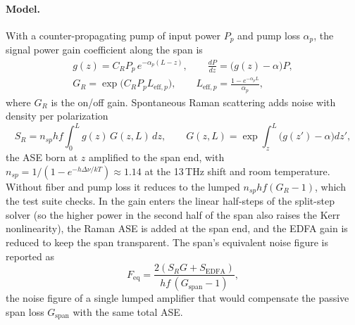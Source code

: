 \paragraph{Model.} With a counter-propagating pump of input power $P_p$ and pump loss $\alpha_p$, the
signal power gain coefficient along the span is
\begin{gather}
  g(z)=C_RP_p\,e^{-\alpha_p(L-z)},\qquad \frac{dP}{dz}=\big(g(z)-\alpha\big)P,\\
  G_R=\exp\big(C_RP_pL_{\mathrm{eff},p}\big),\qquad L_{\mathrm{eff},p}=\frac{1-e^{-\alpha_pL}}{\alpha_p},
\end{gather}
where $G_R$ is the on/off gain. Spontaneous Raman scattering adds noise with density per polarization
\begin{equation}
  S_R=n_{sp}hf\int_0^Lg(z)\,G(z,L)\,dz,\qquad G(z,L)=\exp\int_z^L\big(g(z')-\alpha\big)dz',
\end{equation}
the ASE born at $z$ amplified to the span end, with $n_{sp}=1/(1-e^{-h\Delta\nu/kT})\approx1.14$ at the 13\,THz
shift and room temperature. Without fiber and pump loss it reduces to the lumped
$n_{sp}hf(G_R-1)$, which the test suite checks. In  the gain enters the linear
half-steps of the split-step solver (so the higher power in the second half of the span also
raises the Kerr nonlinearity), the Raman ASE is added at the span end, and the EDFA gain is reduced
to keep the span transparent. The span's equivalent noise figure is reported as
\begin{equation}
  F_{\mathrm{eq}}=\frac{2(S_RG+S_{\mathrm{EDFA}})}{hf\,(G_{\mathrm{span}}-1)},
\end{equation}
the noise figure of a single lumped amplifier that would compensate the passive span loss
$G_{\mathrm{span}}$ with the same total ASE.

